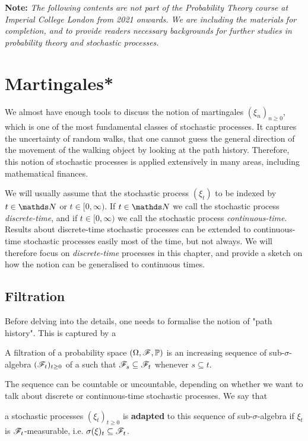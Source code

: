 \textbf{Note:} \textit{The following contents are not part of the Probability Theory course at Imperial College London from 2021 onwards. We are including the materials for completion, and to provide readers necessary backgrounds for further studies in probability theory and stochastic processes.}

\section{Martingales*}
We almost have enough tools to discuss the notion of martingales $(\xi_n)_{n\geq 0}$, which is one of the most fundamental classes of stochastic processes. It captures the uncertainty of random walks, that one cannot guess the general direction of the movement of the walking object by looking at the path history. Therefore, this notion of stochastic processes is applied extensively in many areas, including mathematical finances.

\begin{remark}
We will usually assume that the stochastic process $(\xi_t)$ to be indexed by $t \in \N$ or $t \in [0,\infty)$. If $t \in \N$ we call the stochastic process \textit{discrete-time}, and if $t \in [0,\infty)$ we call the stochastic process \textit{continuous-time}. Results about discrete-time stochastic processes can be extended to continuous-time stochastic processes easily most of the time, but not always. We will therefore focus on \textit{discrete-time} processes in this chapter, and provide a sketch on how the notion can be generalised to continuous times.
\end{remark}

\subsection{Filtration}
Before delving into the details, one needs to formalise the notion of "path history". This is captured by a 

\begin{definition}[Filtration]
A filtration of a probability space $(\Omega,\mathcal{F},\mathbb{P})$ is an increasing sequence of sub-$\sigma$-algebra $(\mathcal{F}_t)_{t\geq 0}$ of a  such that $\mathcal{F}_s \subseteq \mathcal{F}_t$ whenever $s \subseteq t$.
\end{definition}

The sequence can be countable or uncountable, depending on whether we want to talk about discrete or continuous-time stochastic processes. We say that 

\begin{definition}
a stochastic processes $(\xi_t)_{t\geq 0}$ is \textbf{adapted} to this sequence of sub-$\sigma$-algebra if $\xi_t$ is $\mathcal{F}_t$-measurable, i.e. $\sigma(\xi)_t \subseteq \mathcal{F}_t$.
\end{definition}

